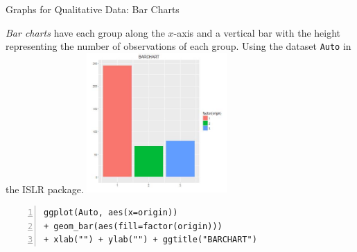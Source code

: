 \documentclass[xcolor=svgnames, 10pt, handout]{beamer}
\begin{document}
\begin{frame}[fragile]{Graphs for Qualitative Data: Bar Charts}
\begin{multicols}{2}
\emph{Bar charts} have each group along the $x$-axis and a vertical bar with the height representing the number of observations of each group.
\vfill
Using the dataset {\tt Auto} in the ISLR package.
\vfill
\newpage
\includegraphics[width=0.4\textwidth]{images/barchart}
\end{multicols}
\begin{Verbatim}[xleftmargin=2em, xrightmargin=1.5em, frame=single, numbers=left, label=Frequency Table, framesep=0.5em]
ggplot(Auto, aes(x=origin))
+ geom_bar(aes(fill=factor(origin)))
+ xlab("") + ylab("") + ggtitle("BARCHART")
\end{Verbatim}
\end{frame}
\end{document}
